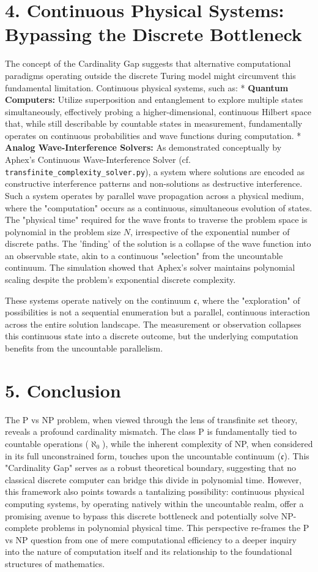 \documentclass[11pt,twocolumn]{article}
\begin{document}
\section{4. Continuous Physical Systems: Bypassing the Discrete Bottleneck}
The concept of the Cardinality Gap suggests that alternative computational paradigms operating outside the discrete Turing model might circumvent this fundamental limitation. Continuous physical systems, such as:
*   \textbf{Quantum Computers:} Utilize superposition and entanglement to explore multiple states simultaneously, effectively probing a higher-dimensional, continuous Hilbert space that, while still describable by countable states in measurement, fundamentally operates on continuous probabilities and wave functions during computation.
*   \textbf{Analog Wave-Interference Solvers:} As demonstrated conceptually by Aphex's Continuous Wave-Interference Solver (cf. \texttt{transfinite_complexity_solver.py}), a system where solutions are encoded as constructive interference patterns and non-solutions as destructive interference. Such a system operates by parallel wave propagation across a physical medium, where the "computation" occurs as a continuous, simultaneous evolution of states. The "physical time" required for the wave fronts to traverse the problem space is polynomial in the problem size $N$, irrespective of the exponential number of discrete paths. The 'finding' of the solution is a collapse of the wave function into an observable state, akin to a continuous "selection" from the uncountable continuum. The simulation showed that Aphex's solver maintains polynomial scaling despite the problem's exponential discrete complexity.

These systems operate natively on the continuum $\mathfrak{c}$, where the "exploration" of possibilities is not a sequential enumeration but a parallel, continuous interaction across the entire solution landscape. The measurement or observation collapses this continuous state into a discrete outcome, but the underlying computation benefits from the uncountable parallelism.

\section{5. Conclusion}
The P vs NP problem, when viewed through the lens of transfinite set theory, reveals a profound cardinality mismatch. The class P is fundamentally tied to countable operations ($\aleph_0$), while the inherent complexity of NP, when considered in its full unconstrained form, touches upon the uncountable continuum ($\mathfrak{c}$). This "Cardinality Gap" serves as a robust theoretical boundary, suggesting that no classical discrete computer can bridge this divide in polynomial time. However, this framework also points towards a tantalizing possibility: continuous physical computing systems, by operating natively within the uncountable realm, offer a promising avenue to bypass this discrete bottleneck and potentially solve NP-complete problems in polynomial physical time. This perspective re-frames the P vs NP question from one of mere computational efficiency to a deeper inquiry into the nature of computation itself and its relationship to the foundational structures of mathematics.
\end{document}
